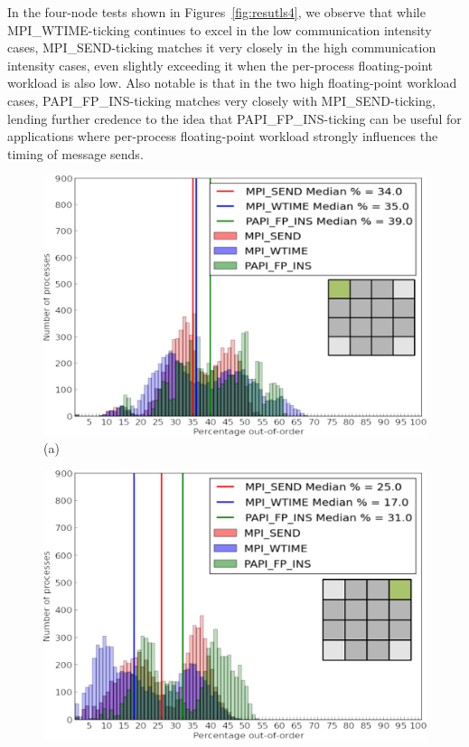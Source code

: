 In the four-node tests shown in Figures~\ref{fig:resutls4}, we
observe that while MPI\_WTIME-ticking continues to excel in the low
communication intensity cases, MPI\_SEND-ticking matches it very
closely in the high communication intensity cases, even slightly
exceeding it when the per-process floating-point workload is also
low. Also notable is that in the two high floating-point workload
cases, PAPI\_FP\_INS-ticking matches very closely with
MPI\_SEND-ticking, lending further credence to the idea that
PAPI\_FP\_INS-ticking can be useful for applications where per-process
floating-point workload strongly influences the timing of message
sends.
\begin{figure}[!htb]
    \begin{minipage}[b]{0.5\linewidth}
        \centering
        \includegraphics[width=0.95\linewidth]{chapter_3_figures/hist_nodes4_procs64_particles1000_cycles10_bufferSize5.pdf}
        \\ (a) \\
    \end{minipage}
    \begin{minipage}[b]{0.5\linewidth}
        \centering
        \includegraphics[width=0.95\linewidth]{chapter_3_figures/hist_nodes4_procs64_particles1000_cycles10_bufferSize5000.pdf}

\end{minipage}
\end{figure}
